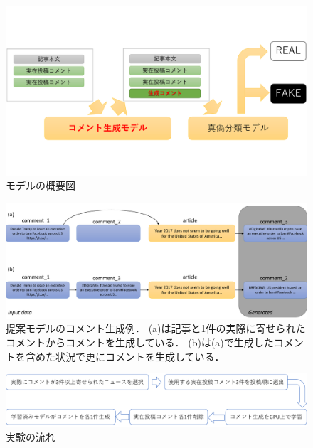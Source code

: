 \begin{figure}
    \centering
    \includegraphics[width=\linewidth,pagebox=cropbox,clip]{figures/fig_model.pdf}
    \caption{モデルの概要図}
    \label{fig:model}
\end{figure}

\begin{figure}[h]
    \centering
    \includegraphics[width=\linewidth,pagebox=cropbox,clip]{figures/fig_method.pdf}
    \caption{
        提案モデルのコメント生成例．
        (a)は記事と1件の実際に寄せられたコメントからコメントを生成している．
        (b)は(a)で生成したコメントを含めた状況で更にコメントを生成している．
    }
    \label{fig:method}
\end{figure}

\begin{figure}[t]
    \centering
    \includegraphics[width=\linewidth,pagebox=cropbox,clip]{figures/fig_process.pdf}
    \caption{実験の流れ}
    \label{fig:process}
\end{figure}

